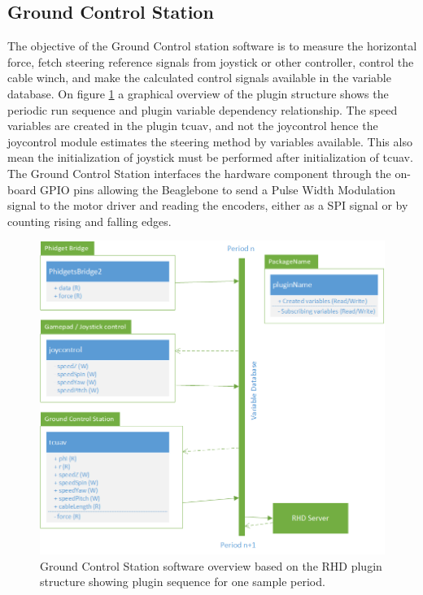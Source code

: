 \subsection{Ground Control Station}
The objective of the Ground Control station software is to measure the horizontal force, fetch steering reference signals from joystick or other controller, control the cable winch, and make the calculated control signals available in the variable database. On figure \ref{fig:GCS-software-overview} a graphical overview of the plugin structure shows the periodic run sequence and plugin variable dependency relationship. The speed variables are created in the plugin tcuav, and not the joycontrol hence the joycontrol module estimates the steering method by variables available. This also mean the initialization of joystick must be performed after initialization of tcuav. \\
\noindent
The Ground Control Station interfaces the hardware component through the on-board GPIO pins allowing the Beaglebone to send a Pulse Width Modulation signal to the motor driver and reading the encoders, either as a SPI signal or by counting rising and falling edges.


\begin{figure}[hbtp]
\centering
\includegraphics[scale=0.8]{graphics/Visio/GCS-software-overview.png}
\caption[Ground Control Station software overview]{Ground Control Station software overview based on the RHD plugin structure showing plugin sequence for one sample period.}
\label{fig:GCS-software-overview}
\end{figure}




